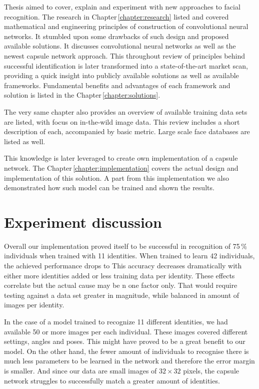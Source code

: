Thesis aimed to cover, explain and experiment with new approaches to facial recognition. The research in Chapter\,\ref{chapter:research} listed and covered mathematical and engineering principles of construction of convolutional neural networks. It stumbled upon some drawbacks of such design and proposed available solutions. It discusses convolutional neural networks as well as the newest capsule network approach. This throughout review of principles behind successful identification is later transformed into a state-of-the-art market scan, providing a quick insight into publicly available solutions as well as available frameworks. Fundamental benefits and advantages of each framework and solution is listed in the Chapter\,\ref{chapter:solutions}.

The very same chapter also provides an overview of available training data sets are listed, with focus on in-the-wild image data. This review includes a short description of each, accompanied by basic metric. Large scale face databases are listed as well.

This knowledge is later leveraged to create own implementation of a capsule network. The Chapter\,\ref{chapter:implementation} covers the actual design and implementation of this solution. A part from this implementation we also demonstrated how such model can be trained and shown the results.

\section{Experiment discussion}
Overall our implementation proved itself to be successful in recognition of 75\,\% individuals when trained with 11 identities. When trained to learn 42 individuals, the achieved performance drops to  This accuracy decreases dramatically with either more identities added or less training data per identity. These effects correlate but the actual cause may be n one factor only. That would require testing against a data set greater in magnitude, while balanced in amount of images per identity.

In the case of a model trained to recognize 11 different identities, we had available 50 or more images per each individual. These images covered different settings, angles and poses. This might have proved to be a great benefit to our model. On the other hand, the fewer amount of individuals to recognise there is much less parameters to be learned in the network and therefore the error margin is smaller. And since our data are small images of $32\times32$ pixels, the capsule network struggles to successfully match a greater amount of identities.

